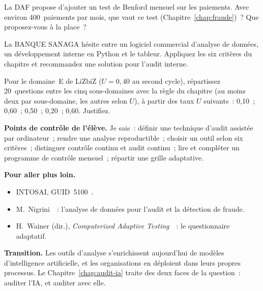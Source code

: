 \begin{boxexo}[title={\ding{45}\quad Exercice~27.8. Benford en continu \niveaumoyen}]
La DAF propose d'ajouter un test de Benford mensuel sur les paiements. Avec
environ 400~paiements par mois, que vaut ce test (Chapitre~\ref{chap:fraude})~?
Que proposez-vous à la place~?
\end{boxexo}

\begin{boxexo}[title={\ding{45}\quad Exercice~27.9. Le choix d'un outil \niveauexpert}]
La BANQUE SANAGA hésite entre un logiciel commercial d'analyse de données,
un développement interne en Python et le tableur. Appliquez les six
critères du chapitre et recommandez une solution pour l'audit interne.
\end{boxexo}

\begin{boxexo}[title={\ding{45}\quad Exercice~27.10. Une grille adaptative \niveauexpert}]
Pour le domaine~E de LiZbiZ ($U = 0{,}40$ au second cycle), répartissez
20~questions entre les cinq sous-domaines avec la règle du chapitre
(au moins deux par sous-domaine, les autres selon $U$), à partir des taux
$U$ suivants~: 0,10~; 0,60~; 0,50~; 0,20~; 0,60. Justifiez.
\end{boxexo}

\bigskip

\begin{boxinfo}
\textbf{Points de contrôle de l'élève.} Je sais~: définir une technique
d'audit assistée par ordinateur~; rendre une analyse reproductible~;
choisir un outil selon six critères~; distinguer contrôle continu et audit
continu~; lire et compléter un programme de contrôle mensuel~; répartir
une grille adaptative.
\end{boxinfo}

\begin{boxinfo}
\textbf{Pour aller plus loin.}
\begin{itemize}
    \item INTOSAI, GUID~5100~\cite{intosai2019guid5100}.
    \item M.~Nigrini~\cite{nigrini2012benford}~: l'analyse de données pour
          l'audit et la détection de fraude.
    \item H.~Wainer (dir.), \textit{Computerized Adaptive
          Testing}~\cite{wainer2000cat}~: le questionnaire adaptatif.
\end{itemize}
\end{boxinfo}

\begin{boxinfo}
\textbf{Transition.} Les outils d'analyse s'enrichissent aujourd'hui de
modèles d'intelligence artificielle, et les organisations en déploient
dans leurs propres processus. Le Chapitre~\ref{chap:audit-ia} traite des
deux faces de la question~: auditer l'IA, et auditer avec elle.
\end{boxinfo}
